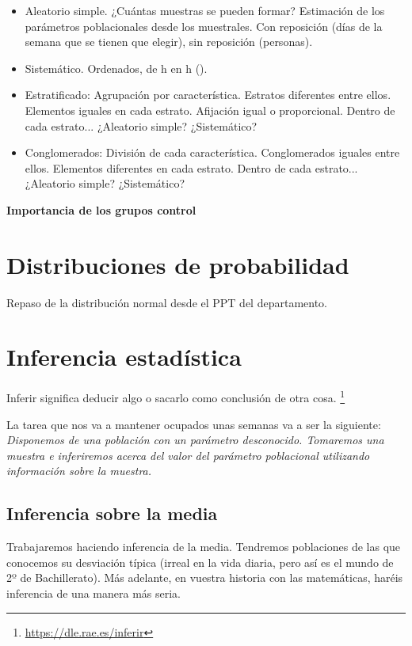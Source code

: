 \begin{itemize}
    \item Aleatorio simple.
        \subitem ¿Cuántas muestras se pueden formar?
        \subitem Estimación de los parámetros poblacionales desde los muestrales.
        \subitem Con reposición (días de la semana que se tienen que elegir), sin reposición (personas).
    \item Sistemático.
    \subitem Ordenados, de h en h ().
    \item Estratificado:
    \subitem Agrupación por característica. Estratos diferentes entre ellos. Elementos iguales en cada estrato.
    \subitem Afijación igual o proporcional.
    \subitem Dentro de cada estrato... ¿Aleatorio simple? ¿Sistemático?
    \item Conglomerados:
    \subitem División de cada característica. Conglomerados iguales entre ellos. Elementos diferentes en cada estrato.
    \subitem Dentro de cada estrato... ¿Aleatorio simple? ¿Sistemático?
\end{itemize}


\textbf{Importancia de los grupos control}

\section{Distribuciones de probabilidad}

Repaso de la distribución normal desde el PPT del departamento.
% 
\section{Inferencia estadística}

Inferir significa deducir algo o sacarlo como conclusión de otra cosa. \footnote{\href{https://dle.rae.es/inferir}{https://dle.rae.es/inferir}}

La tarea que nos va a mantener ocupados unas semanas va a ser la siguiente: \textit{Disponemos de una población con un parámetro desconocido. Tomaremos una muestra e inferiremos acerca del valor del parámetro poblacional utilizando información sobre la muestra.}


\subsection{Inferencia sobre la media}

Trabajaremos haciendo inferencia de la media. 
%
Tendremos poblaciones de las que conocemos su desviación típica (irreal en la vida diaria, pero así es el mundo de 2º de Bachillerato). Más adelante, en vuestra historia con las matemáticas, haréis inferencia de una manera más seria.

